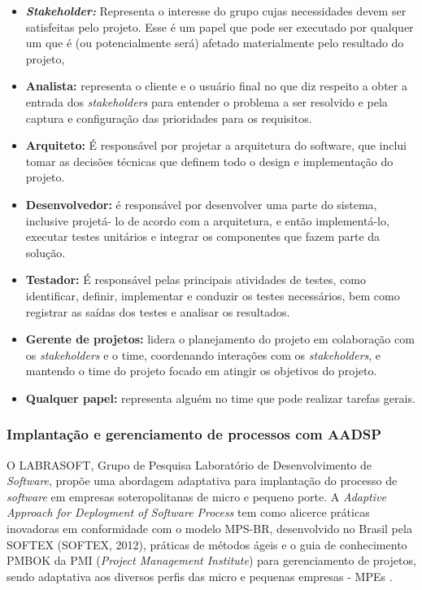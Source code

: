 \documentclass{acm_proc_article-sp}
\begin{document}
\begin{itemize}
\item \textbf{\textit{Stakeholder:}} Representa o interesse do grupo cujas necessidades devem ser satisfeitas
pelo projeto. Esse é um papel que pode ser executado por qualquer um que é (ou
potencialmente será) afetado materialmente pelo resultado do projeto,
\item \textbf{Analista:}  representa o cliente e o usuário final no que diz respeito a obter a entrada
dos \textit{stakeholders} para entender o problema a ser resolvido e pela captura e
configuração das prioridades para os requisitos.
\item \textbf{Arquiteto:} É responsável por projetar a arquitetura do software, que inclui tomar as
decisões técnicas que definem todo o design e implementação do projeto.
\item \textbf{Desenvolvedor:} é responsável por desenvolver uma parte do sistema, inclusive projetá-
lo de acordo com a arquitetura, e então implementá-lo, executar testes unitários e
integrar os componentes que fazem parte da solução.
\item \textbf{Testador:} É responsável pelas principais atividades de testes, como identificar, definir,
implementar e conduzir os testes necessários, bem como registrar as saídas dos testes
e analisar os resultados.
\item \textbf{Gerente de projetos:} lidera o planejamento do projeto em colaboração com os
\textit{stakeholders} e o time, coordenando interações com os \textit{stakeholders}, e mantendo o
time do projeto focado em atingir os objetivos do projeto.
\item \textbf{Qualquer papel:} representa alguém no time que pode realizar tarefas gerais.
\end{itemize}

\subsubsection{Implantação e gerenciamento de processos com AADSP}
O LABRASOFT, Grupo de Pesquisa Laboratório de Desenvolvimento de \textit{Software}, propõe uma abordagem adaptativa para implantação do processo de \textit{software} em empresas soteropolitanas de micro e pequeno porte. A \textit{Adaptive Approach for Deployment of Software Process} tem como alicerce práticas inovadoras em conformidade com o modelo MPS-BR, desenvolvido no Brasil pela SOFTEX (SOFTEX, 2012), práticas de métodos ágeis e o guia de conhecimento PMBOK da PMI (\textit{Project Management Institute}) para gerenciamento de projetos, sendo adaptativa aos diversos perfis das micro e pequenas empresas - MPEs \cite{aadsp:hibirdo}. 
\end{document}
